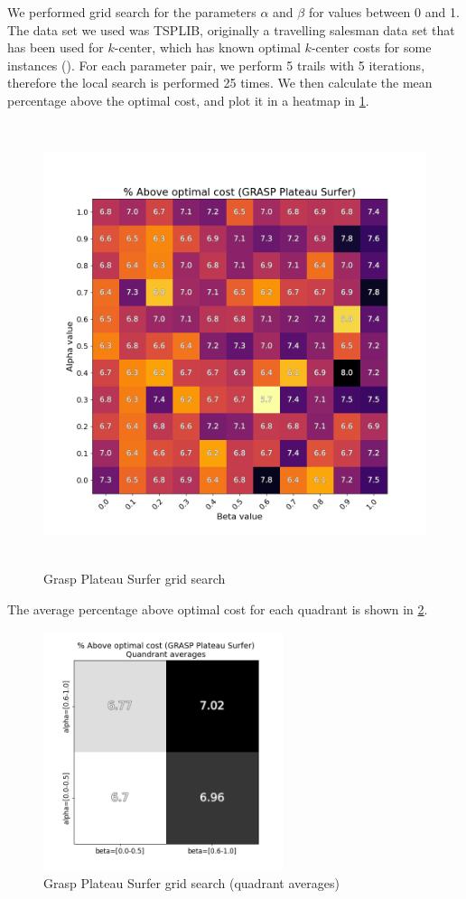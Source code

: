 We performed grid search for the parameters $\alpha$ and $\beta$ for values between 0 and 1. The data set we used was TSPLIB, originally a travelling salesman data set that has been used for $k$-center, which has known optimal $k$-center costs for some instances (\cite{pullan_memetic_2008}). For each parameter pair, we perform 5 trails with 5 iterations, therefore the local search is performed 25 times. We then calculate the mean percentage above the optimal cost, and plot it in a heatmap in \cref{fig:grid_search_heatmap}.

\begin{figure}[H]
    \centering
    \includegraphics[height=13cm]{images/grasp_heatmap.png}
    \caption{Grasp Plateau Surfer grid search}
    \label{fig:grid_search_heatmap}
\end{figure}

The average percentage above optimal cost for each quadrant is shown in \cref{fig:grid_search_quadrant}.

\begin{figure}[H]
    \centering
    \includegraphics[height=7cm]{images/quadrant_averages_grasp.png}
    \caption{Grasp Plateau Surfer grid search (quadrant averages)}
    \label{fig:grid_search_quadrant}
\end{figure}